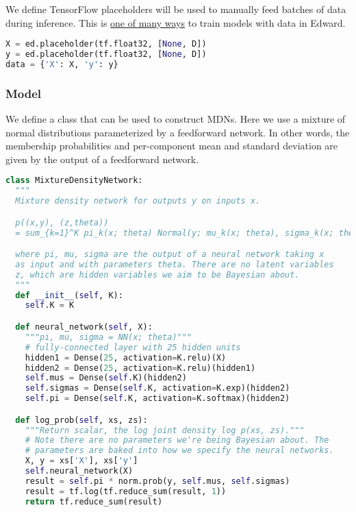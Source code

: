 We define TensorFlow placeholders will be used to manually feed batches of data during inference. This is \href{http://edwardlib.org/api/data}{one of many ways} to train models with data in Edward.

\begin{lstlisting}[language=Python]
X = ed.placeholder(tf.float32, [None, D])
y = ed.placeholder(tf.float32, [None, D])
data = {'X': X, 'y': y}
\end{lstlisting}


\subsubsection{Model}

We define a class that can be used to construct MDNs. Here we use a
mixture of normal distributions parameterized by a feedforward
network. In other words, the membership probabilities and
per-component mean and standard deviation are given by the output of a
feedforward network.

\begin{lstlisting}[language=Python]
class MixtureDensityNetwork:
  """
  Mixture density network for outputs y on inputs x.

  p((x,y), (z,theta))
  = sum_{k=1}^K pi_k(x; theta) Normal(y; mu_k(x; theta), sigma_k(x; theta))

  where pi, mu, sigma are the output of a neural network taking x
  as input and with parameters theta. There are no latent variables
  z, which are hidden variables we aim to be Bayesian about.
  """
  def __init__(self, K):
    self.K = K

  def neural_network(self, X):
    """pi, mu, sigma = NN(x; theta)"""
    # fully-connected layer with 25 hidden units
    hidden1 = Dense(25, activation=K.relu)(X)
    hidden2 = Dense(25, activation=K.relu)(hidden1)
    self.mus = Dense(self.K)(hidden2)
    self.sigmas = Dense(self.K, activation=K.exp)(hidden2)
    self.pi = Dense(self.K, activation=K.softmax)(hidden2)

  def log_prob(self, xs, zs):
    """Return scalar, the log joint density log p(xs, zs)."""
    # Note there are no parameters we're being Bayesian about. The
    # parameters are baked into how we specify the neural networks.
    X, y = xs['X'], xs['y']
    self.neural_network(X)
    result = self.pi * norm.prob(y, self.mus, self.sigmas)
    result = tf.log(tf.reduce_sum(result, 1))
    return tf.reduce_sum(result)
\end{lstlisting}

